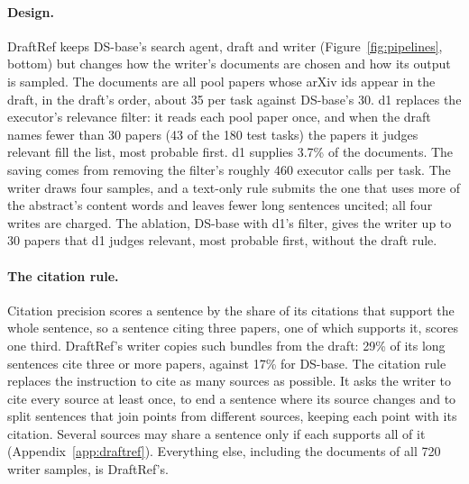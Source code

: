 \documentclass[11pt, letterpaper]{article}
\begin{document}
\paragraph{Design.} DraftRef keeps DS-base's search agent, draft and writer
(Figure~\ref{fig:pipelines}, bottom) but changes how the writer's documents are chosen and how its
output is sampled. The documents are all pool papers whose arXiv ids appear in the draft, in the
draft's order, about 35 per task against DS-base's 30. d1 replaces the executor's relevance filter:
it reads each pool paper once, and when the draft names fewer than 30 papers (43 of the 180 test
tasks) the papers it judges relevant fill the list, most probable first. d1 supplies 3.7\% of the
documents. The saving comes from removing the filter's roughly 460 executor calls per task. The
writer draws four samples, and a text-only rule submits the one that uses more of the abstract's
content words and leaves fewer long sentences uncited; all four writes are charged. The ablation,
DS-base with d1's filter, gives the writer up to 30 papers that d1 judges relevant, most probable
first, without the draft rule.

\paragraph{The citation rule.} Citation precision scores a sentence by the share of its citations
that support the whole sentence, so a sentence citing three papers, one of which supports it,
scores one third. DraftRef's writer copies such bundles from the draft: 29\% of its long sentences
cite three or more papers, against 17\% for DS-base. The citation rule replaces the instruction to
cite as many sources as possible. It asks the writer to cite every source at least once, to end a
sentence where its source changes and to split sentences that join points from different sources,
keeping each point with its citation. Several sources may share a sentence only if each supports
all of it (Appendix~\ref{app:draftref}). Everything else, including the documents of all 720 writer
samples, is DraftRef's.
\end{document}
